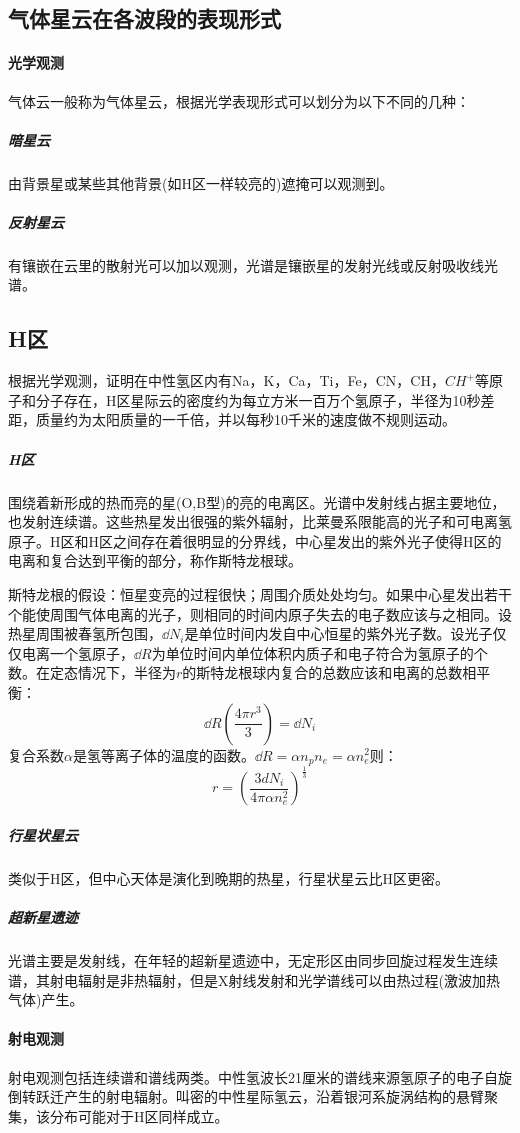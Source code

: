 \subsection{气体星云在各波段的表现形式}
\paragraph{光学观测}气体云一般称为气体星云，根据光学表现形式可以划分为以下不同的几种：
\subparagraph{暗星云}由背景星或某些其他背景(如H区一样较亮的)遮掩可以观测到。
\subparagraph{反射星云}有镶嵌在云里的散射光可以加以观测，光谱是镶嵌星的发射光线或反射吸收线光谱。
\subsection{H区}根据光学观测，证明在中性氢区内有Na，K，Ca，Ti，Fe，CN，CH，$CH^+$等原子和分子存在，H区星际云的密度约为每立方米一百万个氢原子，半径为10秒差距，质量约为太阳质量的一千倍，并以每秒10千米的速度做不规则运动。
\subparagraph{H区}围绕着新形成的热而亮的星(O,B型)的亮的电离区。光谱中发射线占据主要地位，也发射连续谱。这些热星发出很强的紫外辐射，比莱曼系限能高的光子和可电离氢原子。H区和H区之间存在着很明显的分界线，中心星发出的紫外光子使得H区的电离和复合达到平衡的部分，称作斯特龙根球。

斯特龙根的假设：恒星变亮的过程很快；周围介质处处均匀。如果中心星发出若干个能使周围气体电离的光子，则相同的时间内原子失去的电子数应该与之相同。设热星周围被春氢所包围，$\dd N_{i}$是单位时间内发自中心恒星的紫外光子数。设光子仅仅电离一个氢原子，$\dd R$为单位时间内单位体积内质子和电子符合为氢原子的个数。在定态情况下，半径为$r$的斯特龙根球内复合的总数应该和电离的总数相平衡：
\begin{equation}
	\dd R\left(\frac{4\pi r^3}{3}\right)=\dd N_{i}
\end{equation}
复合系数$\alpha$是氢等离子体的温度的函数。$\dd R=\alpha n_{p}n_{e}=\alpha n^2_{e}$则：
\begin{equation}
	r=\left(\frac{3dN_{i}}{4\pi\alpha n^2_{e}}\right)^{\frac{1}{3}}
\end{equation}
\subparagraph{行星状星云}类似于H区，但中心天体是演化到晚期的热星，行星状星云比H区更密。
\subparagraph{超新星遗迹}光谱主要是发射线，在年轻的超新星遗迹中，无定形区由同步回旋过程发生连续谱，其射电辐射是非热辐射，但是X射线发射和光学谱线可以由热过程(激波加热气体)产生。
\paragraph{射电观测}射电观测包括连续谱和谱线两类。中性氢波长21厘米的谱线来源氢原子的电子自旋倒转跃迁产生的射电辐射。叫密的中性星际氢云，沿着银河系旋涡结构的悬臂聚集，该分布可能对于H区同样成立。
